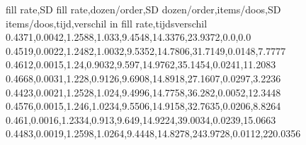 fill rate,SD fill rate,dozen/order,SD dozen/order,items/doos,SD items/doos,tijd,verschil in fill rate,tijdsverschil
0.4371,0.0042,1.2588,1.033,9.4548,14.3376,23.9372,0.0,0.0
0.4519,0.0022,1.2482,1.0032,9.5352,14.7806,31.7149,0.0148,7.7777
0.4612,0.0015,1.24,0.9032,9.597,14.9762,35.1454,0.0241,11.2083
0.4668,0.0031,1.228,0.9126,9.6908,14.8918,27.1607,0.0297,3.2236
0.4423,0.0021,1.2528,1.024,9.4996,14.7758,36.282,0.0052,12.3448
0.4576,0.0015,1.246,1.0234,9.5506,14.9158,32.7635,0.0206,8.8264
0.461,0.0016,1.2334,0.913,9.649,14.9224,39.0034,0.0239,15.0663
0.4483,0.0019,1.2598,1.0264,9.4448,14.8278,243.9728,0.0112,220.0356
